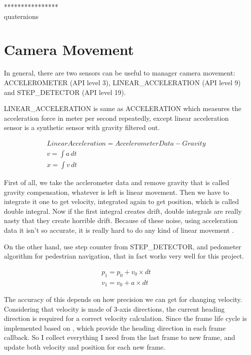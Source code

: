 ****************\\
quaternions\\

\section{Camera Movement}

In general, there are two sensors can be useful to manager camera movement: ACCELEROMETER (API level 3), LINEAR\_ACCELERATION (API level 9) and STEP\_DETECTOR (API level 19). 

LINEAR\_ACCELERATION is same as ACCELERATION which measures the acceleration force in meter per second repeatedly, except linear acceleration sensor is a synthetic sensor with gravity filtered out. 

\[
\begin{array}{lr}
Linear Acceleration = Accelerometer Data - Gravity \\
v = \int a\,dt \\
x = \int v\,dt
\end{array}
\]

First of all, we take the acclerometer data and remove gravity that is called gravity compensation, whatever is left is linear movement. Then we have to integrate it one to get velocity, integrated again to get position, which is called double integral. Now if the first integral creates drift, double integrals are really nasty that they create horrible drift. Because of these noise, using acceleration data it isn't so accurate, it is really hard to do any kind of linear movement \parencite{GoogleTechTalks.sensor-fusion.2010}.

On the other hand, use step counter from STEP\_DETECTOR, and pedometer algorithm for pedestrian navigation, that in fact works very well for this project.

\[
\begin{array}{lr}
p_1 = p_0 + v_0 \times dt \\
v_1 = v_0 + a \times dt
\end{array}
\]

The accuracy of this depends on how precision we can get for changing velocity. Considering that velocity is made of 3-axis directions, the current heading direction is required for a correct velocity calculation. Since the frame life cycle is implemented based on \parencite{Google.VR-SDK.2016}, which provide the heading direction in each frame callback. So I collect everything I need from the last frame to new frame, and update both velocity and position for each new frame.

